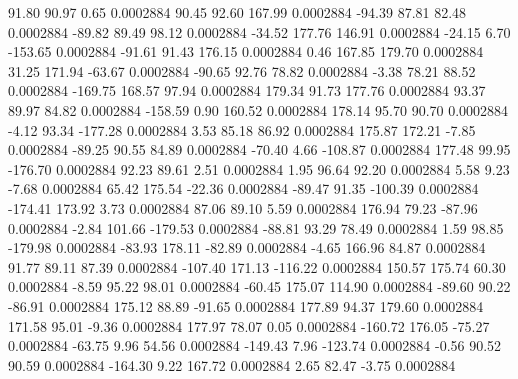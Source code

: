        91.80       90.97        0.65     0.0002884
       90.45       92.60      167.99     0.0002884
      -94.39       87.81       82.48     0.0002884
      -89.82       89.49       98.12     0.0002884
      -34.52      177.76      146.91     0.0002884
      -24.15        6.70     -153.65     0.0002884
      -91.61       91.43      176.15     0.0002884
        0.46      167.85      179.70     0.0002884
       31.25      171.94      -63.67     0.0002884
      -90.65       92.76       78.82     0.0002884
       -3.38       78.21       88.52     0.0002884
     -169.75      168.57       97.94     0.0002884
      179.34       91.73      177.76     0.0002884
       93.37       89.97       84.82     0.0002884
     -158.59        0.90      160.52     0.0002884
      178.14       95.70       90.70     0.0002884
       -4.12       93.34     -177.28     0.0002884
        3.53       85.18       86.92     0.0002884
      175.87      172.21       -7.85     0.0002884
      -89.25       90.55       84.89     0.0002884
      -70.40        4.66     -108.87     0.0002884
      177.48       99.95     -176.70     0.0002884
       92.23       89.61        2.51     0.0002884
        1.95       96.64       92.20     0.0002884
        5.58        9.23       -7.68     0.0002884
       65.42      175.54      -22.36     0.0002884
      -89.47       91.35     -100.39     0.0002884
     -174.41      173.92        3.73     0.0002884
       87.06       89.10        5.59     0.0002884
      176.94       79.23      -87.96     0.0002884
       -2.84      101.66     -179.53     0.0002884
      -88.81       93.29       78.49     0.0002884
        1.59       98.85     -179.98     0.0002884
      -83.93      178.11      -82.89     0.0002884
       -4.65      166.96       84.87     0.0002884
       91.77       89.11       87.39     0.0002884
     -107.40      171.13     -116.22     0.0002884
      150.57      175.74       60.30     0.0002884
       -8.59       95.22       98.01     0.0002884
      -60.45      175.07      114.90     0.0002884
      -89.60       90.22      -86.91     0.0002884
      175.12       88.89      -91.65     0.0002884
      177.89       94.37      179.60     0.0002884
      171.58       95.01       -9.36     0.0002884
      177.97       78.07        0.05     0.0002884
     -160.72      176.05      -75.27     0.0002884
      -63.75        9.96       54.56     0.0002884
     -149.43        7.96     -123.74     0.0002884
       -0.56       90.52       90.59     0.0002884
     -164.30        9.22      167.72     0.0002884
        2.65       82.47       -3.75     0.0002884

